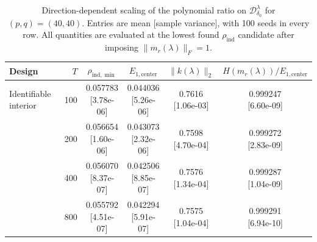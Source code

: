 \documentclass[12pt,letterpaper]{article}
\def\spacingset#1{\renewcommand{\baselinestretch}{#1}\small\normalsize}
\theoremstyle{plain}
\theoremstyle{definition}
\begin{document}
\begin{table}[p]
\begingroup
\spacingset{1.0}
\small\centering
\caption{Direction-dependent scaling of the polynomial ratio on $\mathcal D^\lambda_{\delta_0}$ for $(p,q)=(40,40)$. Entries are mean [sample variance], with 100 seeds in every row. All quantities are evaluated at the lowest found $\rho_{\mathrm{ind}}$ candidate after imposing $\|m_r(\lambda)\|_F=1$.}
\label{s23:lambda:tab:denominator}
\footnotesize
\setlength{\tabcolsep}{4pt}
\renewcommand{\arraystretch}{1.10}
\begin{adjustbox}{max width=\linewidth}
\begin{tabular}{lrcccc}
\toprule
Design & $T$ & $\rho_{\mathrm{ind},\min}$ & $E_{1,\mathrm{center}}$ & $\|k(\lambda)\|_2$ & $H(m_r(\lambda))/E_{1,\mathrm{center}}$\\
\midrule
Identifiable interior & 100 & \shortstack{0.057783\\[-1pt]{\scriptsize[3.78e-06]}} & \shortstack{0.044036\\[-1pt]{\scriptsize[5.26e-06]}} & \shortstack{0.7616\\[-1pt]{\scriptsize[1.06e-03]}} & \shortstack{0.999247\\[-1pt]{\scriptsize[6.60e-09]}}\\
 & 200 & \shortstack{0.056654\\[-1pt]{\scriptsize[1.60e-06]}} & \shortstack{0.043073\\[-1pt]{\scriptsize[2.32e-06]}} & \shortstack{0.7598\\[-1pt]{\scriptsize[4.70e-04]}} & \shortstack{0.999272\\[-1pt]{\scriptsize[2.83e-09]}}\\
 & 400 & \shortstack{0.056070\\[-1pt]{\scriptsize[8.37e-07]}} & \shortstack{0.042506\\[-1pt]{\scriptsize[8.85e-07]}} & \shortstack{0.7576\\[-1pt]{\scriptsize[1.34e-04]}} & \shortstack{0.999287\\[-1pt]{\scriptsize[1.04e-09]}}\\
 & 800 & \shortstack{0.055792\\[-1pt]{\scriptsize[4.51e-07]}} & \shortstack{0.042294\\[-1pt]{\scriptsize[5.91e-07]}} & \shortstack{0.7575\\[-1pt]{\scriptsize[1.04e-04]}} & \shortstack{0.999291\\[-1pt]{\scriptsize[6.94e-10]}}\\

\end{tabular}
\end{adjustbox}
\end{table}
\end{document}

